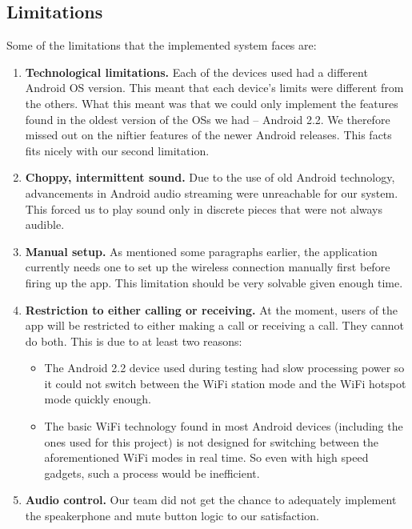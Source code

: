 \documentclass[12pt,svgnames,smaller]{article} %
\begin{document}
	

	
	\subsection{Limitations}
	
	Some of the limitations that the implemented system faces are:
	
	\begin{enumerate}
		\item \textbf{Technological limitations.} Each of the devices used had a different Android OS version. This meant that each device's limits were different from the others. What this meant was that we could only implement the features found in the oldest version of the OSs we had – Android 2.2. We therefore missed out on the niftier features of the newer Android releases. This facts fits nicely with our second limitation.
		\item \textbf{Choppy, intermittent sound.} Due to the use of old Android technology, advancements in Android audio streaming were unreachable for our system. This forced us to play sound only in discrete pieces that were not always audible.
		\item \textbf{Manual setup.} As mentioned some paragraphs earlier, the application currently needs one to set up the wireless connection manually first before firing up the app. This limitation should be very solvable given enough time.
		\item \textbf{Restriction to either calling or receiving.} At the moment, users of the app will be restricted to either making a call or receiving a call. They cannot do both. This is due to at least two reasons:
		\begin{itemize}
			\item The Android 2.2 device used during testing had slow processing power so it could not switch between the WiFi station mode and the WiFi hotspot mode quickly enough.
			\item The basic WiFi technology found in most Android devices (including the ones used for this project) is not designed for switching between the aforementioned WiFi modes in real time. So even with high speed gadgets, such a process would be inefficient. 
		\end{itemize}
		\item \textbf{Audio control.} Our team did not get the chance to adequately implement the speakerphone and mute button logic to our satisfaction. 
	\end{enumerate}
	
\end{document}
